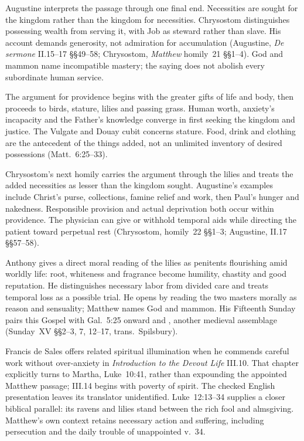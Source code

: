 Augustine interprets the passage through one final end. Necessities are
sought for the kingdom rather than the kingdom for necessities. Chrysostom
distinguishes possessing wealth from serving it, with Job as steward rather
than slave. His account demands generosity, not admiration for accumulation
(Augustine, \emph{De sermone} II.15--17 §§49--58; Chrysostom,
\emph{Matthew} homily~21 §§1--4). God and mammon name incompatible mastery;
the saying does not abolish every subordinate human service.

The argument for providence begins with the greater gifts of life and body,
then proceeds to birds, stature, lilies and passing grass. Human worth,
anxiety's incapacity and the Father's knowledge converge in first seeking the
kingdom and justice. The Vulgate and Douay cubit concerns stature. Food,
drink and clothing are the antecedent of the things added, not an unlimited
inventory of desired possessions (Matt.~6:25--33).

Chrysostom's next homily carries the argument through the lilies and treats
the added necessities as lesser than the kingdom sought. Augustine's
examples include Christ's purse, collections, famine relief and work, then
Paul's hunger and nakedness. Responsible provision and actual deprivation
both occur within providence. The physician can give or withhold temporal
aids while directing the patient toward perpetual rest (Chrysostom,
homily~22 §§1--3; Augustine, II.17 §§57--58).

Anthony gives a direct moral reading of the lilies as penitents flourishing
amid worldly life: root, whiteness and fragrance become humility, chastity
and good reputation. He distinguishes necessary labor from divided care and
treats temporal loss as a possible trial. He opens by reading the two
masters morally as reason and sensuality; Matthew names God and mammon. His
Fifteenth Sunday pairs this Gospel with Gal.~5:25 onward and
, another medieval assemblage
(Sunday~XV §§2--3, 7, 12--17, trans.~Spilsbury).

Francis de Sales offers related spiritual illumination when he commends
careful work without over-anxiety in \emph{Introduction to the Devout Life}
III.10. That chapter explicitly turns to Martha, Luke~10:41, rather than
expounding the appointed Matthew passage; III.14 begins with poverty of
spirit. The checked English presentation leaves its translator unidentified.
Luke~12:13--34 supplies a closer biblical parallel: its ravens and lilies
stand between the rich fool and almsgiving. Matthew's own context retains
necessary action and suffering, including persecution and the daily trouble
of unappointed v.~34.

